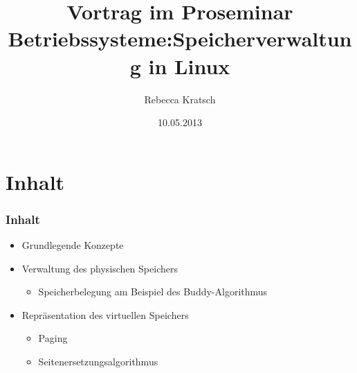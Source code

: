\documentclass[ddcfooter]{tudbeamer}
\begin{document}
\title[Speicherverwaltung in Linux]{Vortrag im Proseminar Betriebssysteme:\vfill Speicherverwaltung in Linux}
\author{Rebecca Kratsch}

\date{10.05.2013}

\maketitle

\section{Inhalt}
\begin{frame}
    \frametitle{Inhalt}
    \begin{itemize}
	\item Grundlegende Konzepte
	\item Verwaltung des physischen Speichers
	\begin{itemize}
	    \item Speicherbelegung am Beispiel des Buddy-Algorithmus
	\end{itemize}
	    \item Repräsentation des virtuellen Speichers
	\begin{itemize}
	    \item Paging
	    \item Seitenersetzungsalgorithmus
	\end{itemize}
    \end{itemize}
\end{frame}
\end{document}
